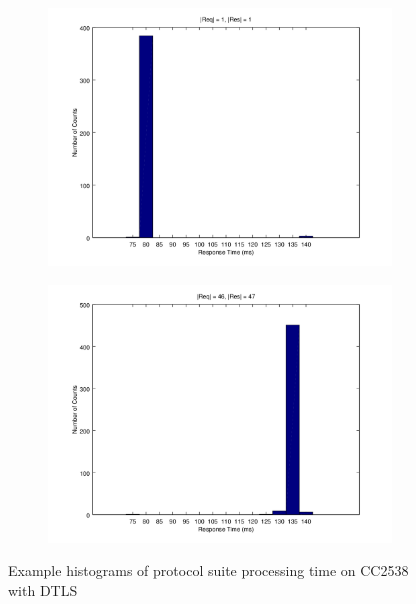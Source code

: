 \begin{figure}[ht!]
	\center
	\begin{subfigure}{.45\textwidth}
	\center
	\includegraphics[width=\linewidth]{fig/dtlstimehist_min.png}
	\end{subfigure}
	\begin{subfigure}{.45\textwidth}
	\center
	\includegraphics[width=\linewidth]{fig/dtlstimehist_max.png}
	\end{subfigure}
	\caption{Example histograms of protocol suite processing time on CC2538 with DTLS}
	\label{Fig: Example histograms of protocol suite processing time on CC2538 with DTLS}
\end{figure}

